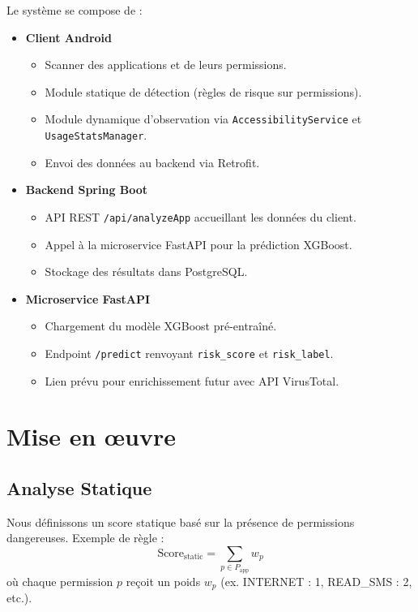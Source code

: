 \documentclass[conference]{IEEEtran}
\begin{document}
Le système se compose de :
\begin{itemize}
  \item \textbf{Client Android}  
    \begin{itemize}
      \item Scanner des applications et de leurs permissions.
      \item Module statique de détection (règles de risque sur permissions).
      \item Module dynamique d’observation via \texttt{AccessibilityService} et \texttt{UsageStatsManager}.
      \item Envoi des données au backend via Retrofit.
    \end{itemize}
  \item \textbf{Backend Spring Boot}  
    \begin{itemize}
      \item API REST \texttt{/api/analyzeApp} accueillant les données du client.
      \item Appel à la microservice FastAPI pour la prédiction XGBoost.
      \item Stockage des résultats dans PostgreSQL.
    \end{itemize}
  \item \textbf{Microservice FastAPI}  
    \begin{itemize}
      \item Chargement du modèle XGBoost pré-entraîné.
      \item Endpoint \texttt{/predict} renvoyant \texttt{risk\_score} et \texttt{risk\_label}.
      \item Lien prévu pour enrichissement futur avec API VirusTotal.
    \end{itemize}
\end{itemize}

\section{Mise en œuvre}

\subsection{Analyse Statique}
Nous définissons un score statique basé sur la présence de permissions dangereuses.  
Exemple de règle :  
\[
  \text{Score}_{\mathrm{static}} = \sum_{p \in P_{\mathrm{app}}} w_p
\]
où chaque permission $p$ reçoit un poids $w_p$ (ex. INTERNET : 1, READ\_SMS : 2, etc.).
\end{document}
